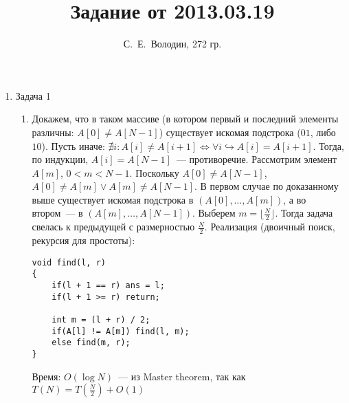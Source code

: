 \documentclass{article}
\title{Задание от 2013.03.19}
\author{С.~Е.~Володин, 272 гр.}
\date{}
\begin{document}
\maketitle
\begin{enumerate} 
\item Задача 1
\begin{enumerate}
\item Докажем, что в таком массиве (в котором первый и последний элементы различны: $A[0]\neq A[N-1]$) существует искомая подстрока ($01$, либо $10$). Пусть иначе: $\nexists i:A[i]\neq A[i+1]\Leftrightarrow\forall i\hookrightarrow A[i]=A[i+1]$. Тогда, по индукции, $A[i]=A[N-1]$~--- противоречие.\newline
Рассмотрим элемент $A[m]$, $0<m<N-1$. Поскольку $A[0]\neq A[N-1]$, $A[0]\neq A[m] \vee A[m] \neq A[N-1]$. В первом случае по доказанному выше существует искомая подстрока в $(A[0],\dots,A[m])$, а во втором~--- в $(A[m],\dots,A[N-1])$. Выберем $m=\lfloor\frac{N}{2}\rfloor$. Тогда задача свелась к предыдущей с размерностью $\frac{N}{2}$.\newline
Реализация (двоичный поиск, рекурсия для простоты):\begin{verbatim}void find(l, r)
{
    if(l + 1 == r) ans = l;
    if(l + 1 >= r) return;

    int m = (l + r) / 2;
    if(A[l] != A[m]) find(l, m);
    else find(m, r);
}
\end{verbatim}
Время: $O(\log N)$~--- из Master theorem, так как $T(N)=T(\frac{N}{2})+O(1)$


\end{enumerate}
\end{enumerate}
\end{document}
